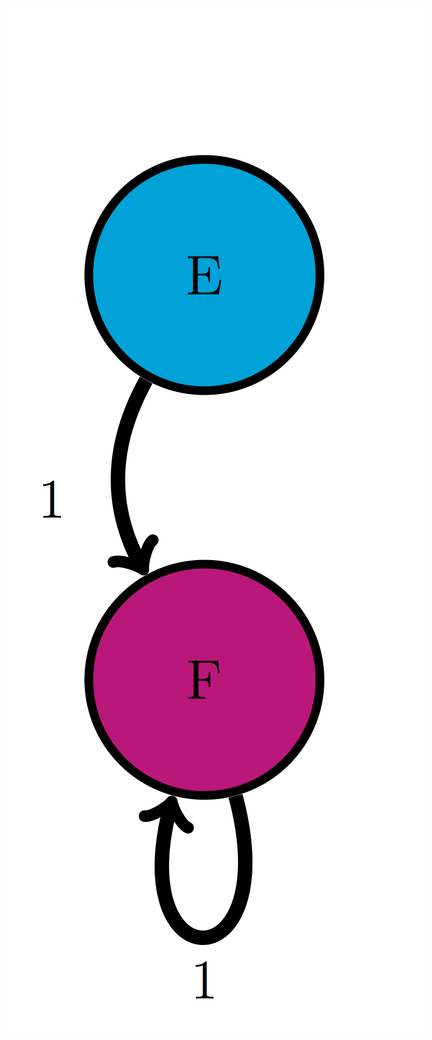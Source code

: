 \documentclass[
  letterpaper,
  DIV=11,
  numbers=noendperiod]{scrreprt}
\begin{document}
\includegraphics{./ch10/EF_trans_diag.png}
\end{document}
